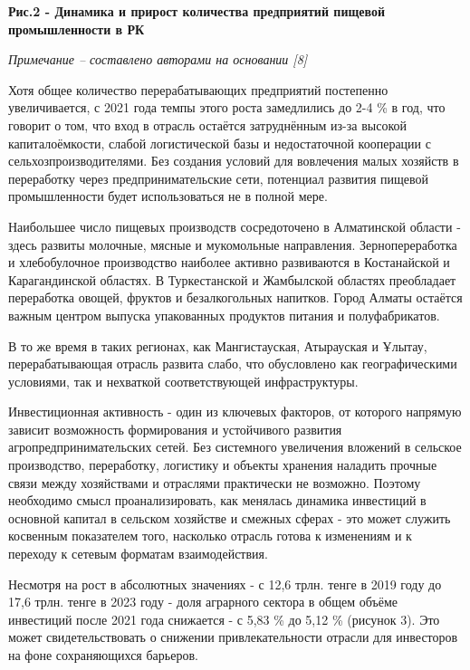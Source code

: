 {\bfseries Рис.2 - Динамика и прирост количества предприятий пищевой
промышленности в РК}

\emph{Примечание -- составлено авторами на основании {[}8{]}}

\begin{multicols}{2}
Хотя общее количество перерабатывающих предприятий постепенно
увеличивается, с 2021 года темпы этого роста замедлились до 2-4 \% в
год, что говорит о том, что вход в отрасль остаётся затруднённым из-за
высокой капиталоёмкости, слабой логистической базы и недостаточной
кооперации с сельхозпроизводителями. Без создания условий для вовлечения
малых хозяйств в переработку через предпринимательские сети, потенциал
развития пищевой промышленности будет использоваться не в полной мере.

Наибольшее число пищевых производств сосредоточено в Алматинской области
- здесь развиты молочные, мясные и мукомольные направления.
Зернопереработка и хлебобулочное производство наиболее активно
развиваются в Костанайской и Карагандинской областях. В Туркестанской и
Жамбылской областях преобладает переработка овощей, фруктов и
безалкогольных напитков. Город Алматы остаётся важным центром выпуска
упакованных продуктов питания и полуфабрикатов.

В то же время в таких регионах, как Мангистауская, Атырауская и Ұлытау,
перерабатывающая отрасль развита слабо, что обусловлено как
географическими условиями, так и нехваткой соответствующей
инфраструктуры.

Инвестиционная активность - один из ключевых факторов, от которого
напрямую зависит возможность формирования и устойчивого развития
агропредпринимательских сетей. Без системного увеличения вложений в
сельское производство, переработку, логистику и объекты хранения
наладить прочные связи между хозяйствами и отраслями практически не
возможно. Поэтому необходимо смысл проанализировать, как менялась
динамика инвестиций в основной капитал в сельском хозяйстве и смежных
сферах - это может служить косвенным показателем того, насколько отрасль
готова к изменениям и к переходу к сетевым форматам взаимодействия.

Несмотря на рост в абсолютных значениях - с 12,6 трлн. тенге в 2019 году
до 17,6 трлн. тенге в 2023 году - доля аграрного сектора в общем объёме
инвестиций после 2021 года снижается - с 5,83 \% до 5,12 \% (рисунок 3).
Это может свидетельствовать о снижении привлекательности отрасли для
инвесторов на фоне сохраняющихся барьеров.
\end{multicols}

